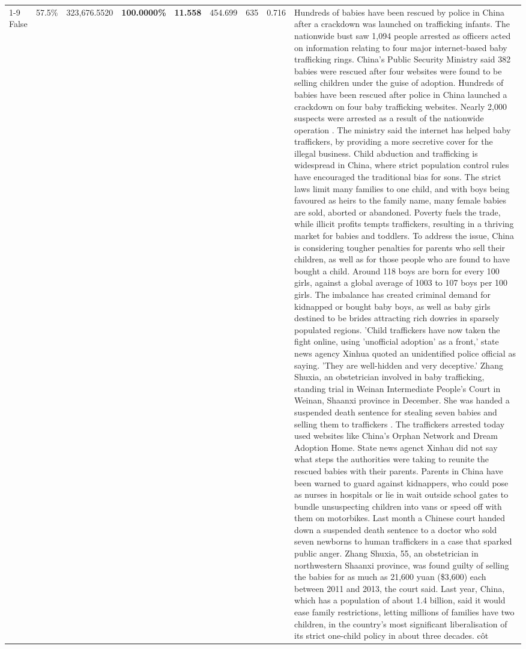 \begin{table}[H]
\begin{tabular}{lllrlllll}
\cline{1-9}
False & 57.5\% & 323,676.5520 & \bfseries \color{red} 100.0000\% & \bfseries \color{red} 11.558 & 454.699 & 635 & 0.716 & Hundreds of babies have been rescued by police in China after a crackdown was launched on trafficking infants. The nationwide bust saw 1,094 people arrested as officers acted on information relating to four major internet-based baby trafficking rings. China's Public Security Ministry said 382 babies were rescued after four websites were found to be selling children under the guise of adoption. Hundreds of babies have been rescued after police in China launched a crackdown on four baby trafficking websites. Nearly 2,000 suspects were arrested as a result of the nationwide operation . The ministry said the internet has helped baby traffickers, by providing a more secretive cover for the illegal business. Child abduction and trafficking is widespread in China, where strict population control rules have encouraged the traditional bias for sons. The strict laws limit many families to one child, and with boys being favoured as heirs to the family name, many female babies are sold, aborted or abandoned. Poverty fuels the trade, while illicit profits tempts traffickers, resulting in a thriving market for babies and toddlers. To address the issue, China is considering tougher penalties for parents who sell their children, as well as for those people who are found to have bought a child. Around 118 boys are born for every 100 girls, against a global average of 1003 to 107 boys per 100 girls. The imbalance has created criminal demand for kidnapped or bought baby boys, as well as baby girls destined to be brides attracting rich dowries in sparsely populated regions. 'Child traffickers have now taken the fight online, using 'unofficial adoption' as a front,' state news agency Xinhua quoted an unidentified police official as saying. 'They are well-hidden and very deceptive.' Zhang Shuxia, an obstetrician involved in baby trafficking, standing trial in Weinan Intermediate People's Court in Weinan, Shaanxi province in December. She was handed a suspended death sentence for stealing seven babies and selling them to traffickers . The traffickers arrested today used websites like China's Orphan Network and Dream Adoption Home. State news agenct Xinhau did not say what steps the authorities were taking to reunite the rescued babies with their parents. Parents in China have been warned to guard against kidnappers, who could pose as nurses in hospitals or lie in wait outside school gates to bundle unsuspecting children into vans or speed off with them on motorbikes. Last month a Chinese court handed down a suspended death sentence to a doctor who sold seven newborns to human traffickers in a case that sparked public anger. Zhang Shuxia, 55, an obstetrician in northwestern Shaanxi province, was found guilty of selling the babies for as much as 21,600 yuan (\$3,600) each between 2011 and 2013, the court said. Last year, China, which has a population of about 1.4 billion, said it would ease family restrictions, letting millions of families have two children, in the country's most significant liberalisation of its strict one-child policy in about three decades. côt \\

\end{tabular}
\end{table}
